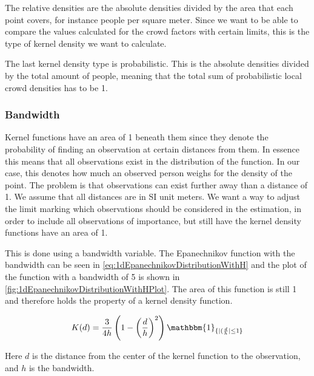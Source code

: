 The relative densities are the absolute densities divided by the area that each point covers, for instance people per square meter. Since we want to be able to compare the values calculated for the crowd factors with certain limits, this is the type of kernel density we want to calculate.

The last kernel density type is probabilistic. This is the absolute densities divided by the total amount of people, meaning that the total sum of probabilistic local crowd densities has to be 1.

\subsubsection{Bandwidth}

Kernel functions have an area of 1 beneath them since they denote the probability of finding an observation at certain distances from them. In essence this means that all observations exist in the distribution of the function. In our case, this denotes how much an observed person weighs for the density of the point. The problem is that observations can exist further away than a distance of 1. We assume that all distances are in SI unit meters. We want a way to adjust the limit marking which observations should be considered in the estimation, in order to include all observations of importance, but still have the kernel density functions have an area of 1. 

This is done using a bandwidth variable. The Epanechnikov function with the bandwidth can be seen in \cref{eq:1dEpanechnikovDistributionWithH} and the plot of the function with a bandwidth of 5 is shown in \cref{fig:1dEpanechnikovDistributionWithHPlot}. The area of this function is still 1 and therefore holds the property of a kernel density function.

\begin{equation}
\label{eq:1dEpanechnikovDistributionWithH}
K(d) = \frac{3}{4 h} \left( 1-\left(\frac{d}{h}\right)^2 \right) \mathbbm{1}_{\{|(\frac{d}{h}| \leq 1\}}
\end{equation}

Here $d$ is the distance from the center of the kernel function to the observation, and $h$ is the bandwidth.

